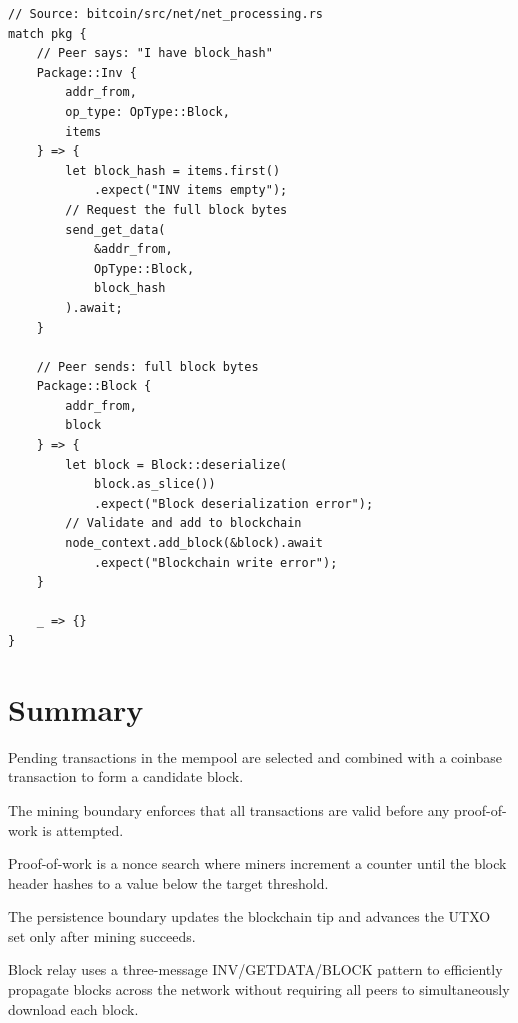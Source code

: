 \begin{listing}[htbp]
\caption{P2P receive: block from peer (, block arms)}
\label{lst:9-6-11}
\begin{verbatim}
// Source: bitcoin/src/net/net_processing.rs
match pkg {
    // Peer says: "I have block_hash"
    Package::Inv {
        addr_from,
        op_type: OpType::Block,
        items
    } => {
        let block_hash = items.first()
            .expect("INV items empty");
        // Request the full block bytes
        send_get_data(
            &addr_from,
            OpType::Block,
            block_hash
        ).await;
    }

    // Peer sends: full block bytes
    Package::Block {
        addr_from,
        block
    } => {
        let block = Block::deserialize(
            block.as_slice())
            .expect("Block deserialization error");
        // Validate and add to blockchain
        node_context.add_block(&block).await
            .expect("Blockchain write error");
    }

    _ => {}
}
\end{verbatim}
\end{listing}

\section{Summary}
\label{sec:ch09-6-summary}

\begin{chaptersummary}
  \item Pending transactions in the mempool are selected and combined with a coinbase transaction to form a candidate block.
  \item The mining boundary enforces that all transactions are valid before any proof-of-work is attempted.
  \item Proof-of-work is a nonce search where miners increment a counter until the block header hashes to a value below the target threshold.
  \item The persistence boundary updates the blockchain tip and advances the UTXO set only after mining succeeds.
  \item Block relay uses a three-message INV/GETDATA/BLOCK pattern to efficiently propagate blocks across the network without requiring all peers to simultaneously download each block.
\end{chaptersummary}
